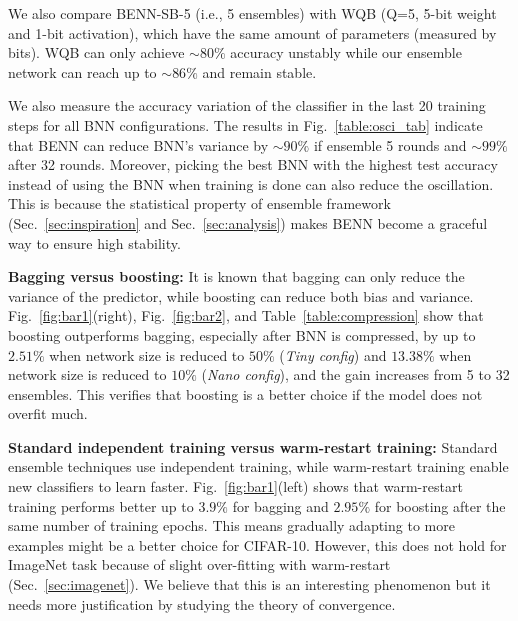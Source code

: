 \documentclass[10pt,twocolumn,letterpaper]{article}
\begin{document}
We also compare BENN-SB-5 (i.e., 5 ensembles) with WQB (Q=5, 5-bit weight and 1-bit activation), which have the same amount of parameters (measured by bits). WQB can only achieve $\sim 80\%$ accuracy unstably while our ensemble network can reach up to $\sim 86\%$ and remain stable.

We also measure the accuracy variation of the classifier in the last 20 training steps for all BNN configurations. The results in Fig.~\ref{table:osci_tab} indicate that BENN can reduce BNN's variance by $\sim 90\%$ if ensemble 5 rounds and $\sim 99\%$ after 32 rounds. Moreover, picking the best BNN with the highest test accuracy instead of using the BNN when training is done can also reduce the oscillation. This is because the statistical property of ensemble framework (Sec.~\ref{sec:inspiration} and Sec.~\ref{sec:analysis}) makes BENN become a graceful way to ensure high stability.

\textbf{Bagging versus boosting: }It is known that bagging can only reduce the variance of the predictor, while boosting can reduce both bias and variance. Fig.~\ref{fig:bar1}(right), Fig.~\ref{fig:bar2}, and Table~\ref{table:compression} show that boosting outperforms bagging, especially after BNN is compressed, by up to $2.51\%$ when network size is reduced to $50\%$ (\textit{Tiny config}) and $13.38\%$ when network size is reduced to $10\%$ (\textit{Nano config}), and the gain increases from 5 to 32 ensembles. This verifies that boosting is a better choice if the model does not overfit much.

\textbf{Standard independent training versus warm-restart training: }Standard ensemble techniques use independent training, while warm-restart training enable new classifiers to learn faster. Fig.~\ref{fig:bar1}(left) shows that warm-restart training performs better up to $3.9\%$ for bagging and $2.95\%$ for boosting after the same number of training epochs. This means gradually adapting to more examples might be a better choice for CIFAR-10. However, this does not hold for ImageNet task because of slight over-fitting with warm-restart (Sec.~\ref{sec:imagenet}). We believe that this is an interesting phenomenon but it needs more justification by studying the theory of convergence.
\end{document}
